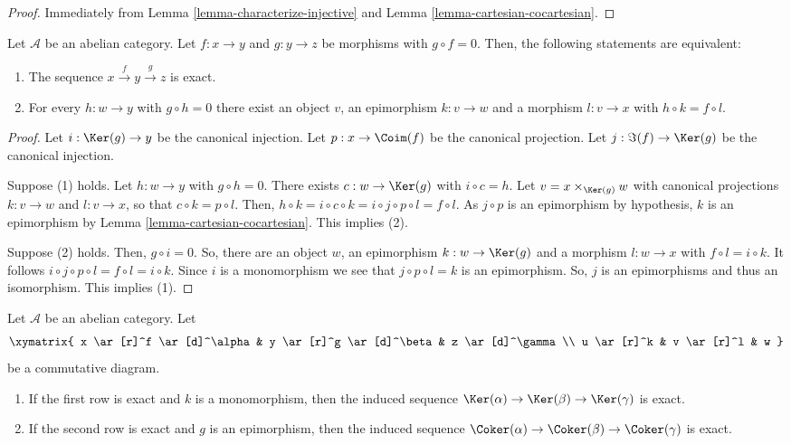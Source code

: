 \begin{proof}
Immediately from Lemma \ref{lemma-characterize-injective} and
Lemma \ref{lemma-cartesian-cocartesian}.
\end{proof}

\begin{lemma}
\label{lemma-check-exactness-fibre-product}
Let $\mathcal{A}$ be an abelian category. Let $f:x\to y$ and $g:y\to z$ 
be morphisms with $g\circ f=0$. Then, the following statements are equivalent:
\begin{enumerate}
\item The sequence $x\overset{f}\to y\overset{g}\to z$ is exact.
\item For every $h:w\to y$ with $g\circ h=0$ there exist an object $v$, 
an epimorphism $k:v\to w$ and a morphism $l:v\to x$ with $h\circ k=f\circ l$.
\end{enumerate}
\end{lemma}

\begin{proof}
Let $i:\Ker(g)\to y$ be the canonical injection. Let 
$p:x\to\Coim(f)$ be the canonical projection. Let 
$j:\Im(f)\to\Ker(g)$ be the canonical injection.

\medskip\noindent
Suppose (1) holds. Let $h:w\to y$ with $g\circ h=0$. There exists 
$c:w\to\Ker(g)$ with $i\circ c=h$. 
Let $v=x\times_{\Ker(g)}w$ with canonical projections 
$k:v\to w$ and $l:v\to x$, so that $c\circ k=p\circ l$. 
Then, $h\circ k=i\circ c\circ k=i\circ j\circ p\circ l=f\circ l$. 
As $j\circ p$ is an epimorphism by hypothesis, $k$ is an 
epimorphism by Lemma \ref{lemma-cartesian-cocartesian}. This implies (2).

\medskip\noindent
Suppose (2) holds. Then, $g\circ i=0$. So, there are an object 
$w$, an epimorphism $k:w\to\Ker(g)$ and a morphism 
$l:w\to x$ with $f\circ l=i\circ k$. It follows 
$i\circ j\circ p\circ l=f\circ l=i\circ k$. Since $i$ is a 
monomorphism we see that $j\circ p\circ l=k$ is an epimorphism. 
So, $j$ is an epimorphisms and thus an isomorphism. This implies (1).
\end{proof}

\begin{lemma}
\label{lemma-exact-kernel-sequence}
Let $\mathcal{A}$ be an abelian category. Let
$$
\xymatrix{
x \ar[r]^f \ar[d]^\alpha &
y \ar[r]^g \ar[d]^\beta &
z \ar[d]^\gamma\\
u \ar[r]^k & v \ar[r]^l & w
}
$$
be a commutative diagram.
\begin{enumerate}
\item If the first row is exact and $k$ is a monomorphism, then the induced 
sequence $\Ker(\alpha) \to \Ker(\beta) \to \Ker(\gamma)$ 
is exact.
\item If the second row is exact and $g$ is an epimorphism, then the induced 
sequence
$\Coker(\alpha) \to \Coker(\beta) \to \Coker(\gamma)$ 
is exact.
\end{enumerate}
\end{lemma}

